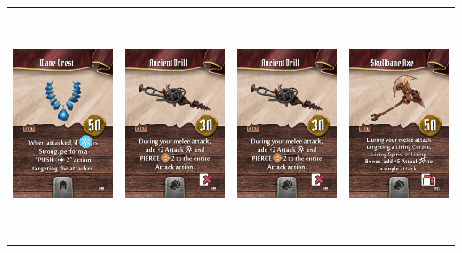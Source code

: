 \documentclass{minimal}
\begin{document}
{\begin{longtable}{llll}
\includegraphics[width=44mm,height=68mm]{./64-151/gh-111-wave-crest.png} &
\includegraphics[width=44mm,height=68mm]{./64-151/gh-112-ancient-drill.png} &
\includegraphics[width=44mm,height=68mm]{./64-151/gh-112-ancient-drill.png} &
\includegraphics[width=44mm,height=68mm]{./64-151/gh-113-skullbane-axe.png}\\ 

\end{longtable}}
\end{document}
